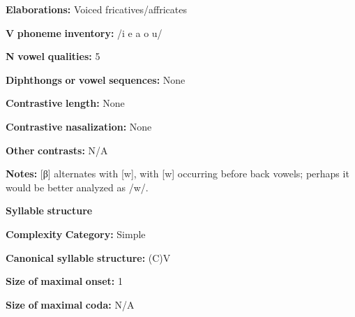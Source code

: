 \documentclass[output=paper]{langsci/langscibook}
\begin{document}
\begin{styleBody}
\textbf{Elaborations:} Voiced fricatives/affricates
\end{styleBody}

\begin{styleBody}
\textbf{V} \textbf{phoneme} \textbf{inventory:} /i e a o u/
\end{styleBody}

\begin{styleBody}
\textbf{N} \textbf{vowel} \textbf{qualities:} 5
\end{styleBody}

\begin{styleBody}
\textbf{Diphthongs} \textbf{or} \textbf{vowel} \textbf{sequences:} None
\end{styleBody}

\begin{styleBody}
\textbf{Contrastive} \textbf{length:} None
\end{styleBody}

\begin{styleBody}
\textbf{Contrastive} \textbf{nasalization:} None
\end{styleBody}

\begin{styleBody}
\textbf{Other} \textbf{contrasts:} N/A
\end{styleBody}

\begin{styleBody}
\textbf{Notes:} [β] alternates with [w], with [w] occurring before back vowels; perhaps it would be better analyzed as /w/.
\end{styleBody}

\begin{styleBody}
\textbf{Syllable} \textbf{structure}
\end{styleBody}

\begin{styleBody}
\textbf{Complexity} \textbf{Category:} Simple
\end{styleBody}

\begin{styleBody}
\textbf{Canonical} \textbf{syllable} \textbf{structure:} (C)V \citep[7]{Dutton1996}
\end{styleBody}

\begin{styleBody}
\textbf{Size} \textbf{of} \textbf{maximal} \textbf{onset:} 1
\end{styleBody}

\begin{styleBody}
\textbf{Size} \textbf{of} \textbf{maximal} \textbf{coda:} N/A
\end{styleBody}
\end{document}

